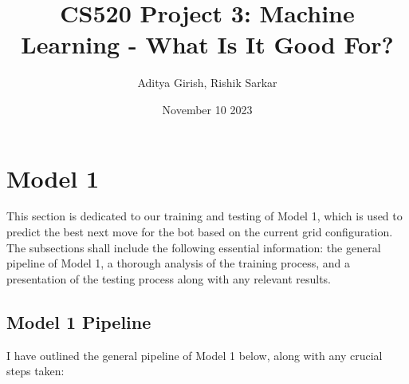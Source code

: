 \documentclass[11pt]{article}
\title{CS520 Project 3: Machine Learning - What Is It Good For?}
\author{Aditya Girish, Rishik Sarkar}
\date{November 10 2023}
\begin{document}
\maketitle

\section{Model 1}

This section is dedicated to our training and testing of Model 1, which is used to predict the best next move for the bot based on the current grid configuration. The subsections shall include the following essential information: the general pipeline of Model 1, a thorough analysis of the training process, and a presentation of the testing process along with any relevant results.

\subsection{Model 1 Pipeline}

I have outlined the general pipeline of Model 1 below, along with any crucial steps taken:
\end{document}
